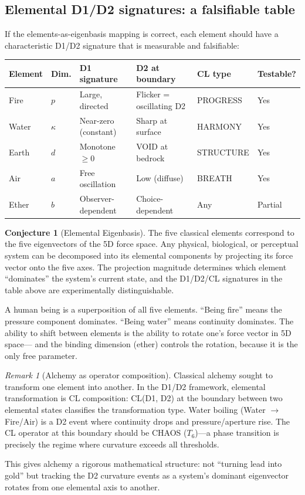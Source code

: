 \documentclass[11pt]{article}
\theoremstyle{definition}
\newtheorem{conjecture}[theorem]{Conjecture}
\theoremstyle{remark}
\newtheorem{remark}[theorem]{Remark}
\begin{document}
\subsection{Elemental D1/D2 signatures: a falsifiable table}

If the elements-as-eigenbasis mapping is correct, each element should have a
characteristic D1/D2 signature that is measurable and falsifiable:

\begin{center}
\begin{tabular}{llllll}
\toprule
\textbf{Element} & \textbf{Dim.} & \textbf{D1 signature} & \textbf{D2 at boundary} & \textbf{CL type} & \textbf{Testable?} \\
\midrule
Fire & $p$ & Large, directed & Flicker = oscillating D2 & PROGRESS & Yes \\
Water & $\kappa$ & Near-zero (constant) & Sharp at surface & HARMONY & Yes \\
Earth & $d$ & Monotone $\geq 0$ & VOID at bedrock & STRUCTURE & Yes \\
Air & $a$ & Free oscillation & Low (diffuse) & BREATH & Yes \\
Ether & $b$ & Observer-dependent & Choice-dependent & Any & Partial \\
\bottomrule
\end{tabular}
\end{center}

\begin{conjecture}[Elemental Eigenbasis]
\label{conj:elements}
The five classical elements correspond to the five eigenvectors of the 5D force space.
Any physical, biological, or perceptual system can be decomposed into its elemental
components by projecting its force vector onto the five axes.  The projection magnitude
determines which element ``dominates'' the system's current state, and the D1/D2/CL
signatures in the table above are experimentally distinguishable.

A human being is a superposition of all five elements.  ``Being fire'' means the
pressure component dominates.  ``Being water'' means continuity dominates.  The ability
to shift between elements is the ability to rotate one's force vector in 5D space---
and the binding dimension (ether) controls the rotation, because it is the only free
parameter.
\end{conjecture}

\begin{remark}[Alchemy as operator composition]
Classical alchemy sought to transform one element into another.  In the D1/D2 framework,
elemental transformation is CL composition: CL(D1, D2) at the boundary between two
elemental states classifies the transformation type.  Water boiling (Water $\to$ Fire/Air)
is a D2 event where continuity drops and pressure/aperture rise.  The CL operator at this
boundary should be CHAOS ($T_6$)---a phase transition is precisely the regime where
curvature exceeds all thresholds.

This gives alchemy a rigorous mathematical structure: not ``turning lead into gold''
but tracking the D2 curvature events as a system's dominant eigenvector rotates from
one elemental axis to another.
\end{remark}
\end{document}
